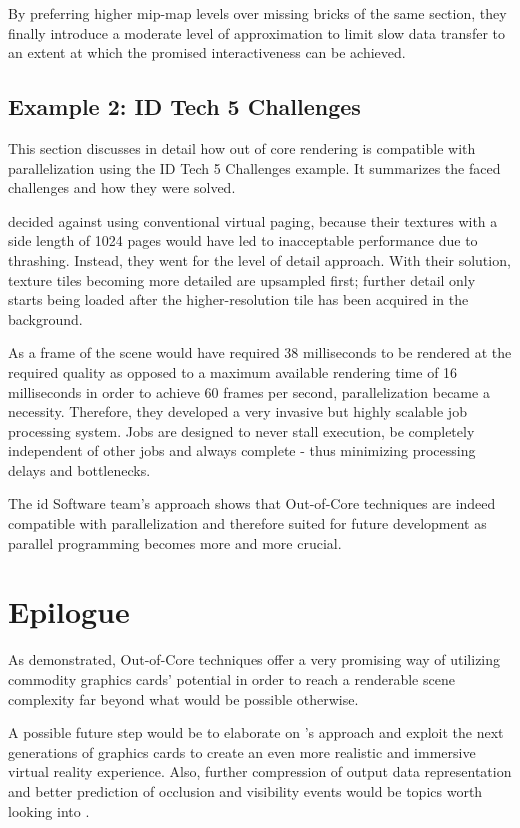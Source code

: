 By preferring higher mip-map levels over missing bricks of the same section, they finally introduce a moderate level of approximation to limit slow data transfer to an extent at which the promised interactiveness can be achieved.

\section{Example 2: ID Tech 5 Challenges}

This section discusses in detail how out of core rendering is compatible with parallelization using the ID Tech 5 Challenges example. It summarizes the faced challenges and how they were solved. 

\cite{van2009id} decided against using conventional virtual paging, because their textures with a side length of 1024 pages would have led to inacceptable performance due to thrashing. Instead, they went for the level of detail approach. With their solution, texture tiles becoming more detailed are upsampled first; further detail only starts being loaded after the higher-resolution tile has been acquired in the background.

As a frame of the scene would have required 38 milliseconds to be rendered at the required quality as opposed to a maximum available rendering time of 16 milliseconds in order to achieve 60 frames per second, parallelization became a necessity. Therefore, they developed a very invasive but highly scalable job processing system. Jobs are designed to never stall execution, be completely independent of other jobs and always complete - thus minimizing processing delays and bottlenecks.

The id Software team's approach shows that Out-of-Core techniques are indeed compatible with parallelization and therefore suited for future development as parallel programming becomes more and more crucial.

\chapter{Epilogue}
\label{ch:Epilogue}

As demonstrated, Out-of-Core techniques offer a very promising way of utilizing commodity graphics cards' potential in order to reach a renderable scene complexity far beyond what would be possible otherwise. 

A possible future step would be to elaborate on \cite{10.1007/978-3-540-40014-1_3}'s approach and exploit the next generations of graphics cards to create an even more realistic and immersive virtual reality experience. Also, further compression of output data representation and better prediction of occlusion and visibility events would be topics worth looking into \cite{Gobbetti:2005:FVM:1073204.1073277}.